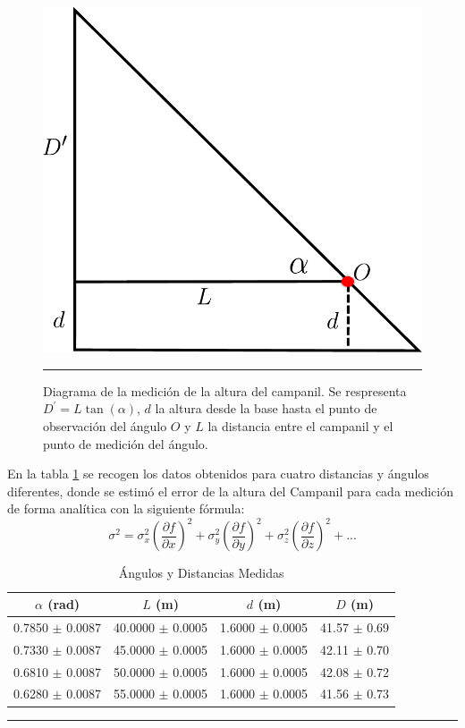 \documentclass[10pt,a4paper]{article}
\begin{document}
\begin{multicols}{2}
		
		\begin{figure}[H]
			\centering
			\includegraphics[scale=0.4]{IMG/camp.pdf} 
			\label{Diagrama campanil}
			\caption{Diagrama de la medición de la altura del campanil. Se respresenta $D^{\prime} = L \tan(\alpha)$,  $d$ la altura desde la base hasta el punto de observación del ángulo $O$ y $L$ la distancia entre el campanil y el punto de medición del ángulo.}
			\rule{80mm}{0.1mm}
		\end{figure}
		
	En la tabla \ref{tab:angulos_distancias.} se recogen los datos obtenidos para cuatro distancias y ángulos diferentes, donde se estimó el error de la altura del Campanil para cada medición de forma analítica con la siguiente fórmula:
		\begin{equation}
\sigma^{2} = \sigma_x^2 \left( \frac{\partial f}{\partial x} \right)^2 + \sigma_y^2 \left( \frac{\partial f}{\partial y} \right)^2 + \sigma_z^2 \left( \frac{\partial f}{\partial z} \right)^2 + ...
		\end{equation}
	\end{multicols}
	
	\begin{table}[H]
		\centering
		\begin{tabular}{|c|c|c|c|}
			\hline
			$\alpha$ (rad) & $L$ (m) & $d$ (m)&  $D$ (m) \\ \hline
			0.7850 $\pm$ 0.0087  & 40.0000 $\pm$ 0.0005 &  1.6000 $\pm$ 0.0005 & 41.57 $\pm$ 0.69\\ 
			0.7330 $\pm$ 0.0087 & 45.0000 $\pm$ 0.0005 & 1.6000 $\pm$ 0.0005 & 42.11 $\pm$ 0.70\\ 
			0.6810 $\pm$ 0.0087 & 50.0000 $\pm$ 0.0005 & 1.6000 $\pm$ 0.0005 &  42.08 $\pm$ 0.72\\ 
			0.6280 $\pm$ 0.0087 & 55.0000 $\pm$ 0.0005 & 1.6000 $\pm$ 0.0005 & 41.56 $\pm$ 0.73\\ \hline
		\end{tabular}
		\caption{Ángulos y Distancias Medidas}
		\label{tab:angulos_distancias.}
		\rule{100mm}{0.1mm}
	\end{table}
\end{document}
